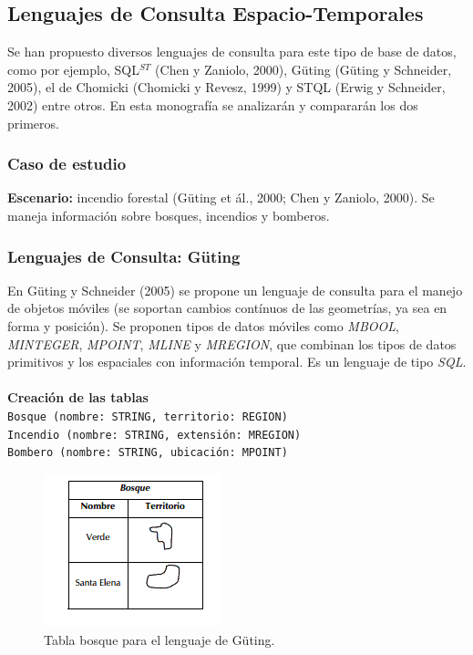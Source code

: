 \documentclass[a4paper,12pt,oneside]{report}
\begin{document}
\subsection*{Lenguajes de Consulta Espacio-Temporales}
Se han propuesto diversos lenguajes de consulta para este tipo de base de datos, como por ejemplo, SQL$^{ST}$ (Chen y Zaniolo, 2000), G\"uting (G\"uting y Schneider, 2005), el de Chomicki (Chomicki y Revesz, 1999) y STQL (Erwig y Schneider, 2002) entre otros. En esta monograf\'ia se analizar\'an y comparar\'an los dos primeros.

\subsubsection*{Caso de estudio}
\textbf{Escenario:} incendio forestal (G\"uting et \'al., 2000; Chen y Zaniolo, 2000). Se maneja informaci\'on sobre bosques, incendios y bomberos.

\subsubsection*{Lenguajes de Consulta: G\"uting}
En G\"uting y Schneider (2005) se propone un lenguaje de consulta para el manejo de objetos m\'oviles (se soportan cambios cont\'inuos de las geometr\'ias, ya sea en forma y posici\'on). Se proponen tipos de datos m\'oviles como \textit{MBOOL}, \textit{MINTEGER}, \textit{MPOINT}, \textit{MLINE} y \textit{MREGION}, que combinan los tipos de datos primitivos y los espaciales con informaci\'on temporal. Es un lenguaje de tipo \textit{SQL}.\\
\ \\
\textbf{Creaci\'on de las tablas}\\
\texttt{Bosque (nombre: STRING, territorio: REGION)\\
Incendio (nombre: STRING, extensi\'on: MREGION)\\
Bombero (nombre: STRING, ubicaci\'on: MPOINT)
}
\begin{figure}[h]
\centering
\includegraphics[scale=0.6]{images/tabosque1.png}
\caption{Tabla bosque para el lenguaje de G\"uting.}
\end{figure}
\end{document}
